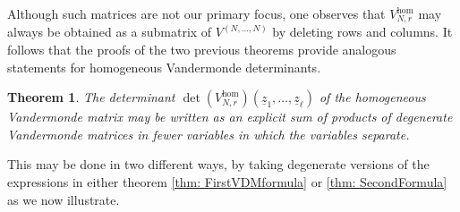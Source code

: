 \documentclass[10pt]{amsart}
\newtheorem{thm}{Theorem}[section]
\theoremstyle{definition}
\theoremstyle{remark}
\numberwithin{equation}{section}
\newcommand{\z}{\underline{z}}
\newcommand{\0}{\color{blue}{\mathsf{0}}}
\begin{document}
Although such matrices  are not our primary focus, one observes that  $V_{N,r}^{\mathrm{hom}} $ may always be  obtained as a submatrix of  $V^{(N,\ldots, N)}$ by deleting rows and columns. It follows that  the proofs of the two previous theorems provide analogous statements for  homogeneous Vandermonde determinants. 


\begin{thm}  \label{thm: homogeneous} The determinant $ \det(V_{N,r}^{\mathrm{hom}} )(\z_1,\ldots , \z_{\ell})$  of the homogeneous  Vandermonde matrix  may be written as an explicit sum of products of  degenerate Vandermonde matrices in fewer variables in which the variables separate. \end{thm}

This may be done in two different ways,  by taking degenerate  versions of the expressions in either  theorem \ref{thm: FirstVDMformula} or \ref{thm: SecondFormula} as we now illustrate.
\end{document}
